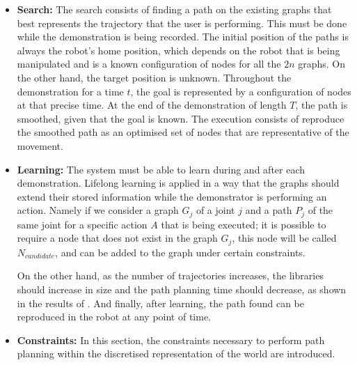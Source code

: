 \documentclass[thesis]{mas_proposal}
\begin{document}
	\begin{itemize}    
			 
		\item \textbf{Search:}
		The search consists of finding a path on the existing graphs that best represents the trajectory that the user is performing. This must be done while the demonstration is being recorded. The initial position of the paths is always the robot's home position, which depends on the robot that is being manipulated and is a known configuration of nodes for all the $2n$ graphs. On the other hand, the target position is unknown. Throughout the demonstration for a time $t$, the goal is represented by a configuration of nodes at that precise time. At the end of the demonstration of length $T$, the path is smoothed, given that the goal is known. The execution consists of reproduce the smoothed path as an optimised set of nodes that are representative of the movement.
		
		\item \textbf{Learning:}
		The system must be able to learn during and after each demonstration. Lifelong learning is applied in a way that the graphs should extend their stored information while the demonstrator is performing an action. Namely if we consider a graph $G_j$ of a joint $j$ and a path $P_j$ of the same joint for a specific action $A$ that is being executed; it is possible to require a node that does not exist in the graph $G_j$, this node will be called $N_{candidate}$, and can be added to the graph under certain constraints.
		
		On the other hand, as the number of trajectories increases, the libraries should increase in size and the path planning time should decrease, as shown in the results of \cite{Berenson2012, Coleman2015}. And finally, after learning, the path found can be reproduced in the robot at any point of time. 
		 
		\item \textbf{Constraints:}
		 In this section, the constraints necessary to perform path planning within the discretised representation of the world are introduced.
		 
		 \begin{itemize}
		 	

\end{itemize}
\end{itemize}
\end{document}
